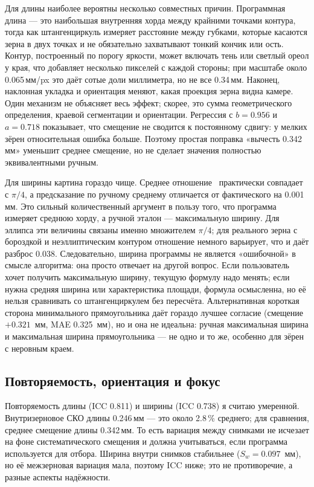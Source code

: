 \documentclass[12pt,a4paper]{article}
\begin{document}
Для длины наиболее вероятны несколько совместных причин. Программная
длина — это наибольшая внутренняя хорда между крайними точками контура,
тогда как штангенциркуль измеряет расстояние между губками, которые
касаются зерна в двух точках и не обязательно захватывают тонкий кончик
или ость. Контур, построенный по порогу яркости, может включать тень или
светлый ореол у края, что добавляет несколько пикселей с каждой стороны;
при масштабе около \num{0.065}\,мм/px это даёт сотые доли миллиметра, но
не все \num{0.34}\,мм. Наконец, наклонная укладка и ориентация меняют,
какая проекция зерна видна камере. Один механизм не объясняет весь
эффект; скорее, это сумма геометрического определения, краевой
сегментации и ориентации. Регрессия с $b = \num{0.956}$ и
$a = \num{0.718}$ показывает, что смещение не сводится к постоянному
сдвигу: у мелких зёрен относительная ошибка больше. Поэтому простая
поправка «вычесть \num{0.342}\,мм» уменьшит среднее смещение, но не
сделает значения полностью эквивалентными ручным.

Для ширины картина гораздо чище. Среднее отношение \WidRatio\
практически совпадает с $\pi/4$, а предсказание по ручному среднему
отличается от фактического на \num{0.001}\,мм. Это сильный
количественный аргумент в пользу того, что программа измеряет среднюю
хорду, а ручной эталон — максимальную ширину. Для эллипса эти величины
связаны именно множителем $\pi/4$; для реального зерна с бороздкой и
неэллиптическим контуром отношение немного варьирует, что и даёт
разброс \num{0.038}. Следовательно, ширина программы не является
«ошибочной» в смысле алгоритма: она просто отвечает на другой вопрос.
Если пользователь хочет получить максимальную ширину, текущую формулу
надо менять; если нужна средняя ширина или характеристика площади,
формула осмысленна, но её нельзя сравнивать со штангенциркулем без
пересчёта. Альтернативная короткая сторона минимального прямоугольника
даёт гораздо лучшее согласие (смещение $+\num{0.321}$~мм, MAE
\num{0.325}~мм), но и она не идеальна: ручная максимальная ширина и
максимальная ширина прямоугольника — не одно и то же, особенно для
зёрен с неровным краем.

\subsection{Повторяемость, ориентация и фокус}

Повторяемость длины (ICC \num{0.811}) и ширины (ICC \num{0.738}) я
считаю умеренной. Внутризерновое СКО длины \num{0.246}\,мм — это около
\num{2.8}\,\% среднего; для сравнения, среднее смещение длины
\num{0.342}\,мм. То есть вариация между снимками не исчезает на фоне
систематического смещения и должна учитываться, если программа
используется для отбора. Ширина внутри снимков стабильнее
($S_w = \num{0.097}$~мм), но её межзерновая вариация мала, поэтому ICC
ниже; это не противоречие, а разные аспекты надёжности.
\end{document}
